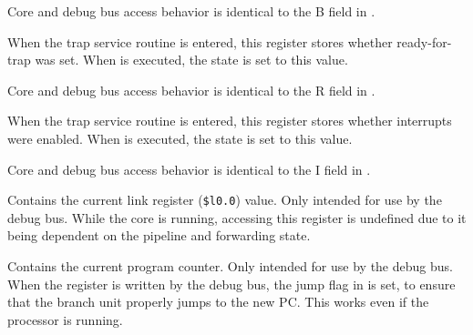 Core and debug bus access behavior is identical to the B field in .

\implementation{}

When the trap service routine is entered, this register stores whether 
ready-for-trap was set. When  is executed, the state is set to this
value.

Core and debug bus access behavior is identical to the R field in .

\implementation{}

When the trap service routine is entered, this register stores whether 
interrupts were enabled. When  is executed, the state is set to this
value.

Core and debug bus access behavior is identical to the I field in .

\implementation{}


Contains the current link register (\texttt{\$l0.0}) value. Only intended for
use by the debug bus. While the core is running, accessing this register is
undefined due to it being dependent on the pipeline and forwarding state.

\implementation{}


Contains the current program counter. Only intended for use by the debug bus.
When the register is written by the debug bus, the jump flag in  is
set, to ensure that the branch unit properly jumps to the new PC. This works
even if the processor is running.

